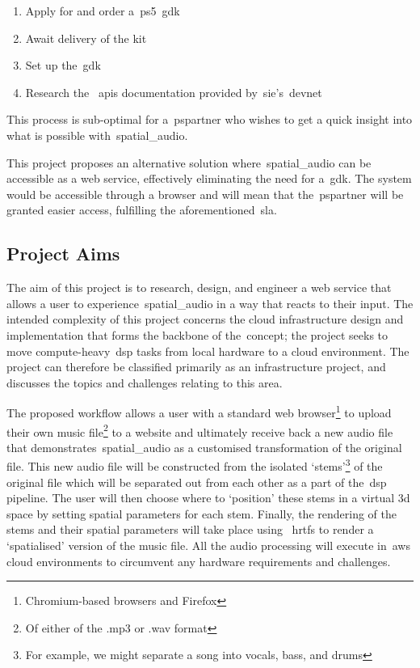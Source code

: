 \begin{enumerate}
    \item Apply for and order a~\gls{ps5}~\gls{gdk}
    \item Await delivery of the kit
    \item Set up the~\gls{gdk}
    \item Research the ~\glspl{api} documentation provided by~\gls{sie}'s~\gls{devnet}
\end{enumerate}

This process is sub-optimal for a~\gls{pspartner} who wishes to get a quick insight into what is possible with~\gls{spatial_audio}.

This project proposes an alternative solution where~\gls{spatial_audio} can be accessible as a web service, effectively eliminating the need for a~\gls{gdk}.
The system would be accessible through a browser and will mean that the~\gls{pspartner} will be granted easier access, fulfilling the aforementioned~\gls{sla}.

\subsection{Project Aims}\label{subsec:aims}

The aim of this project is to research, design, and engineer a web service that allows a user to experience~\gls{spatial_audio} in a way that reacts to their input.
The intended complexity of this project concerns the cloud infrastructure design and implementation that forms the backbone of the\textit{}~concept;
the project seeks to move compute-heavy~\gls{dsp} tasks from local hardware to a cloud environment.
The project can therefore be classified primarily as an infrastructure project, and discusses the topics and challenges relating to this area.

The proposed workflow allows a user with a standard web browser\footnote{Chromium-based browsers and Firefox} to upload their own music file\footnote{Of either of the .mp3 or .wav format} to a website and ultimately receive back a new audio file that demonstrates~\gls{spatial_audio} as a customised transformation of the original file.
This new audio file will be constructed from the isolated `stems'\footnote{For example, we might separate a song into vocals, bass, and drums} of the original file which will be separated out from each other as a part of the~\gls{dsp} pipeline.
The user will then choose where to `position' these stems in a virtual 3d space by setting spatial parameters for each stem.
Finally, the rendering of the stems and their spatial parameters will take place using ~\glspl{hrtf} to render a `spatialised' version of the music file.
All the audio processing will execute in~\gls{aws} cloud environments to circumvent any hardware requirements and challenges.

